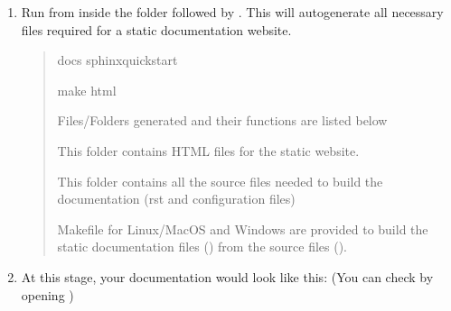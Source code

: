 \documentclass[letterpaper,10pt,english]{sphinxmanual}
\let\sphinxpxdimen\pdfpxdimen\else\newdimen\sphinxpxdimen
\begin{document}
\begin{enumerate}
\item {} 
\sphinxAtStartPar
Run  from inside the  folder followed by .
This will auto\sphinxhyphen{}generate all necessary files required for a static documentation website.
\begin{quote}

\begin{sphinxVerbatim}[commandchars=\\\{\}]
 docs
sphinx\PYGZhy{}quickstart


make html
\end{sphinxVerbatim}

\sphinxAtStartPar
Files/Folders generated and their functions are listed below
\begin{description}
\sphinxAtStartPar
This folder contains HTML files for the static website.

\sphinxAtStartPar
This folder contains all the source files needed to build the documentation (rst and configuration files)

\sphinxAtStartPar
Makefile for Linux/MacOS and Windows are provided to build the static documentation files () from the source files ().

\end{description}
\end{quote}

\item {} 
\sphinxAtStartPar
At this stage, your documentation would look like this: (You can check by opening )
\begin{quote}

\begin{figure}[htbp]
\centering

\noindent\sphinxincludegraphics[width=1920\sphinxpxdimen,height=1080\sphinxpxdimen]{{indepth_doc_stage1}.png}
\end{figure}
\end{quote}

\end{enumerate}
\end{document}
